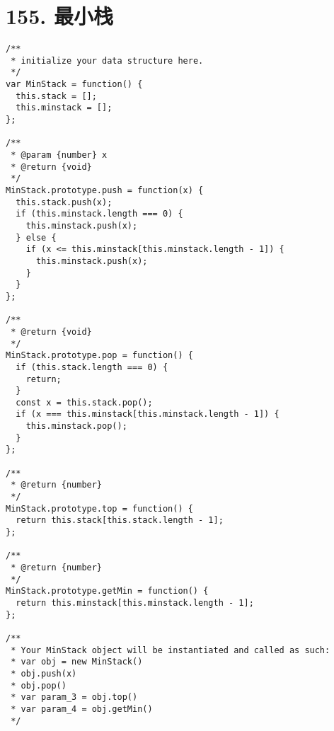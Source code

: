 \newpage
\section{155. 最小栈}
\label{leetcode:155}

\begin{verbatim}
/**
 * initialize your data structure here.
 */
var MinStack = function() {
  this.stack = [];
  this.minstack = [];
};

/**
 * @param {number} x
 * @return {void}
 */
MinStack.prototype.push = function(x) {
  this.stack.push(x);
  if (this.minstack.length === 0) {
    this.minstack.push(x);
  } else {
    if (x <= this.minstack[this.minstack.length - 1]) {
      this.minstack.push(x);
    }
  }
};

/**
 * @return {void}
 */
MinStack.prototype.pop = function() {
  if (this.stack.length === 0) {
    return;
  }
  const x = this.stack.pop();
  if (x === this.minstack[this.minstack.length - 1]) {
    this.minstack.pop();
  }
};

/**
 * @return {number}
 */
MinStack.prototype.top = function() {
  return this.stack[this.stack.length - 1];
};

/**
 * @return {number}
 */
MinStack.prototype.getMin = function() {
  return this.minstack[this.minstack.length - 1];
};

/**
 * Your MinStack object will be instantiated and called as such:
 * var obj = new MinStack()
 * obj.push(x)
 * obj.pop()
 * var param_3 = obj.top()
 * var param_4 = obj.getMin()
 */
\end{verbatim}
